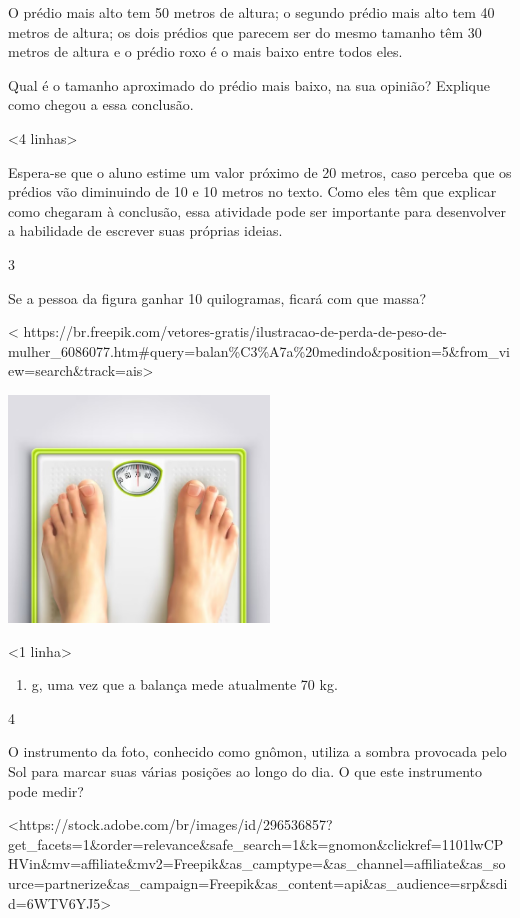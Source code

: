 {O prédio mais alto tem 50 metros de altura; o segundo prédio mais alto
tem 40 metros de altura; os dois prédios que parecem ser do mesmo
tamanho têm 30 metros de altura e o prédio roxo é o mais baixo entre
todos eles.

Qual é o tamanho aproximado do prédio mais baixo, na sua opinião?
Explique como chegou a essa conclusão.

\textless{}4 linhas\textgreater{}

Espera-se que o aluno estime um valor próximo de 20
metros, caso perceba que os prédios vão diminuindo de 10 e 10 metros no
texto. Como eles têm que explicar como chegaram à conclusão, essa
atividade pode ser importante para desenvolver a habilidade de escrever
suas próprias ideias.

\num{3}

Se a pessoa da figura ganhar 10 quilogramas, ficará com que massa?

\textless{}
https://br.freepik.com/vetores-gratis/ilustracao-de-perda-de-peso-de-mulher\_6086077.htm\#query=balan\%C3\%A7a\%20medindo\&position=5\&from\_view=search\&track=ais\textgreater{}

\includegraphics[width=2.72917in,height=2.37665in]{media/image44.jpeg}

\textless{}1 linha\textgreater{}

\begin{enumerate}
\def\labelenumi{\arabic{enumi}.}
\setcounter{enumi}{80}
\item
  g, uma vez que a balança mede atualmente 70 kg.
\end{enumerate}

\num{4}

O instrumento da foto, conhecido como gnômon, utiliza a sombra
provocada pelo Sol para marcar suas várias posições ao longo do dia. O
que este instrumento pode medir?

\textless{}https://stock.adobe.com/br/images/id/296536857?get\_facets=1\&order=relevance\&safe\_search=1\&k=gnomon\&clickref=1101lwCPHVin\&mv=affiliate\&mv2=Freepik\&as\_camptype=\&as\_channel=affiliate\&as\_source=partnerize\&as\_campaign=Freepik\&as\_content=api\&as\_audience=srp\&sdid=6WTV6YJ5\textgreater{}

}
